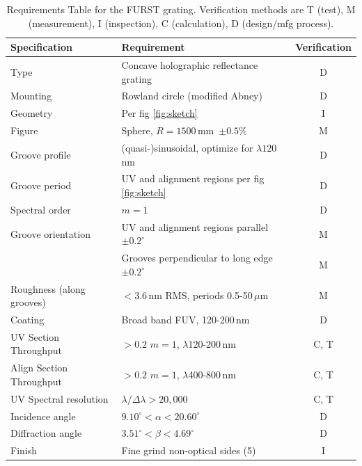 \documentclass[12pt]{article}
\begin{document}
\begin{table}
\caption{Requirements Table for the FURST grating. Verification methods are T (test), 
   M (measurement), I (inspection), C (calculation), D (design/mfg process).}\label{tab:spec}
   \small
   \begin{tabular}{llc} \hline
      Specification     & Requirement                                     & Verification \\ \hline
      Type              & Concave holographic reflectance grating         & D\\
      Mounting          & Rowland circle (modified Abney)                 & D\\
      Geometry          & Per fig \ref{fig:sketch}                        & I\\
      Figure            & Sphere, $R=1500$\,mm\ $\pm 0.5\%$                 & M\\
      Groove profile    & (quasi-)sinusoidal, optimize for $\lambda 120$\,nm & D\\
      Groove period     & UV and alignment regions per fig \ref{fig:sketch} & D\\
      Spectral order    & $m=1$                                            & D\\
      Groove orientation & UV and alignment regions parallel $\pm 0.2^{\circ}$ & M\\
                        & Grooves perpendicular to long edge $\pm 0.2^{\circ}$ & M\\
      Roughness (along grooves) & $<3.6$\,nm RMS, periods 0.5-50\,$\mu$m  & M\\
      Coating           & Broad band FUV, 120-200\,nm                     & D\\
      UV Section Throughput     & $> 0.2$ \@ $m=1$, $\lambda$120-200\,nm  & C, T\\
      Align Section Throughput & $> 0.2$ \@ $m=1$, $\lambda$400-800\,nm   & C, T\\
      UV Spectral resolution & $\lambda/\Delta\lambda > 20,000$           & C, T\\
      Incidence angle   & $9.10^{\circ} < \alpha < 20.60^{\circ}$           & D\\
      Diffraction angle & $3.51^{\circ} < \beta < 4.69^{\circ}$           & D\\
      Finish            & Fine grind non-optical sides (5)                & I\\
      \hline
   \end{tabular}
   \normalsize
\end{table}
\end{document}

